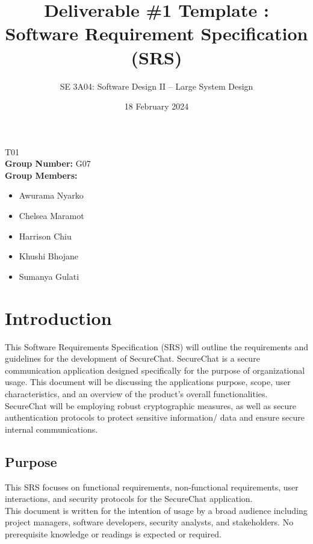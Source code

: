 \documentclass[]{article}
\title{Deliverable \#1 Template : Software Requirement Specification (SRS)}
\author{SE 3A04: Software Design II -- Large System Design}
\date{18 February 2024}
\begin{document}
\maketitle
{} T01\\
{\bf Group Number:} G07 \\
{\bf Group Members:}
\begin{itemize}
	\item Awurama Nyarko
	\item Chelsea Maramot
	\item Harrison Chiu
	\item Khushi Bhojane
	\item Sumanya Gulati
\end{itemize}

\newpage
\section{Introduction}
\label{sec:introduction}
This Software Requirements Specification (SRS) will outline the requirements and guidelines for the development of SecureChat. SecureChat is a secure communication application designed specifically for the purpose of organizational usage. This document will be discussing the applications purpose, scope, user characteristics, and an overview of the product’s overall functionalities. SecureChat will be employing robust cryptographic measures, as well as secure authentication protocols to protect sensitive information/ data and ensure secure internal communications.


\subsection{Purpose}
\label{sub:purpose}
This SRS focuses on functional requirements, non-functional requirements, user interactions, and security protocols for the SecureChat application.\\
This document is written for the intention of usage by a broad audience including project managers, software developers, security analysts, and stakeholders. No prerequisite knowledge or readings is expected or required.
\end{document}
